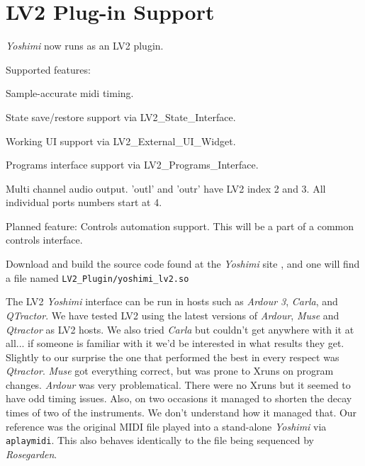 %
%
%

\section{LV2 Plug-in Support}
\label{sec:lv2_plugin}

   \textsl{Yoshimi} now runs as an LV2 plugin.

Supported features:

   \begin{enumber}
      \item Sample-accurate midi timing.
      \item State save/restore support via LV2\_State\_Interface.
      \item Working UI support via LV2\_External\_UI\_Widget.
      \item Programs interface support via LV2\_Programs\_Interface.
      \item Multi channel audio output. 'outl' and 'outr' have LV2 index 2
         and 3. All individual ports numbers start at 4.
   \end{enumber}

   Planned feature: Controls automation support. This will be a part of a
   common controls interface.

   Download and build the source code found at the
   \textsl{Yoshimi} site \cite{yoshimi},
   and one will find a file named
   \texttt{LV2\_Plugin/yoshimi\_lv2.so}

   The LV2 \textsl{Yoshimi} interface can be run in hosts such as
   \textsl{Ardour 3}, \textsl{Carla}, and \textsl{QTractor}.  We have tested
   LV2 using the latest versions of \textsl{Ardour}, \textsl{Muse} and
   \textsl{Qtractor} as LV2 hosts. We also tried \textsl{Carla} but couldn't
   get anywhere with it at all... if someone is familiar with it we'd be
   interested in what results they get.  Slightly to our surprise the one that
   performed the best in every respect was \textsl{Qtractor}. \textsl{Muse} got
   everything correct, but was prone to Xruns on program changes.
   \textsl{Ardour} was very problematical.  There were no Xruns but it seemed
   to have odd timing issues. Also, on two occasions it managed to shorten the
   decay times of two of the instruments.  We don't understand how it managed
   that.  Our reference was the original MIDI file played into a stand-alone
   \textsl{Yoshimi} via \texttt{aplaymidi}. This also behaves identically to
   the file being sequenced by \textsl{Rosegarden}.

